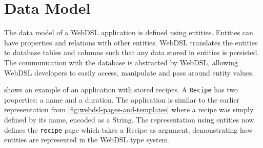   \section{\label{sec:data-model}Data Model}

    The data model of a WebDSL application is defined using entities. Entities can have properties and relations with other entities. WebDSL translates the entities to database tables and columns such that any data stored in entities is persisted. The communication with the database is abstracted by WebDSL, allowing WebDSL developers to easily access, manipulate and pass around entity values.

     shows an example of an application with stored recipes. A \texttt{Recipe} has two properties: a name and a duration. The application is similar to the earlier representation from \cref{fig:webdsl-pages-and-templates} where a recipe was simply defined by its name, encoded as a String. The representation using entities now defines the \texttt{recipe} page which takes a Recipe as argument, demonstrating how entities are represented in the WebDSL type system.

